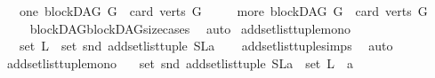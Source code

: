 \begin{isabellebody}
\ \ {\isacharbar}{\kern0pt}\ {\isacharparenleft}{\kern0pt}one{\isacharparenright}{\kern0pt}\ {\isachardoublequoteopen}blockDAG\ G\ {\isasymand}\ card\ {\isacharparenleft}{\kern0pt}verts\ G{\isacharparenright}{\kern0pt}\ {\isacharequal}{\kern0pt}\ {}{\isachardoublequoteclose}\isanewline
\ \ {\isacharbar}{\kern0pt}\ {\isacharparenleft}{\kern0pt}more{\isacharparenright}{\kern0pt}\ {\isachardoublequoteopen}blockDAG\ G\ {\isasymand}\ card\ {\isacharparenleft}{\kern0pt}verts\ G{\isacharparenright}{\kern0pt}\ {\isachargreater}{\kern0pt}\ {}{\isachardoublequoteclose}\isanewline
%
\isadelimproof
\ \ %
\endisadelimproof
%
\isatagproof
{}\isamarkupfalse%
\ \ blockDAG{\isachardot}{\kern0pt}blockDAG{\isacharunderscore}{\kern0pt}size{\isacharunderscore}{\kern0pt}cases\ \isamarkupfalse%
\ auto%
\endisatagproof
{\isafoldproof}%
%
\isadelimproof
%
\endisadelimproof
%
\isadelimdocument
%
\endisadelimdocument
%
\isatagdocument
%
\isamarkuptrue%
%
\endisatagdocument
{\isafolddocument}%
%
\isadelimdocument
%
\endisadelimdocument
{}\isamarkupfalse%
\ add{\isacharunderscore}{\kern0pt}set{\isacharunderscore}{\kern0pt}list{\isacharunderscore}{\kern0pt}tuple{\isacharunderscore}{\kern0pt}mono{\isacharcolon}{\kern0pt}\isanewline
\ \ \ {\isachardoublequoteopen}set\ L\ {\isasymsubseteq}\ set\ {\isacharparenleft}{\kern0pt}snd\ {\isacharparenleft}{\kern0pt}add{\isacharunderscore}{\kern0pt}set{\isacharunderscore}{\kern0pt}list{\isacharunderscore}{\kern0pt}tuple\ {\isacharparenleft}{\kern0pt}{\isacharparenleft}{\kern0pt}S{\isacharcomma}{\kern0pt}L{\isacharparenright}{\kern0pt}{\isacharcomma}{\kern0pt}a{\isacharparenright}{\kern0pt}{\isacharparenright}{\kern0pt}{\isacharparenright}{\kern0pt}{\isachardoublequoteclose}\isanewline
%
\isadelimproof
\ \ %
\endisadelimproof
%
\isatagproof
{}\isamarkupfalse%
\ add{\isacharunderscore}{\kern0pt}set{\isacharunderscore}{\kern0pt}list{\isacharunderscore}{\kern0pt}tuple{\isachardot}{\kern0pt}simps\ \isamarkupfalse%
\ auto%
\endisatagproof
{\isafoldproof}%
%
\isadelimproof
\isanewline
%
\endisadelimproof
\isanewline
{}\isamarkupfalse%
\ add{\isacharunderscore}{\kern0pt}set{\isacharunderscore}{\kern0pt}list{\isacharunderscore}{\kern0pt}tuple{\isacharunderscore}{\kern0pt}mono{}{\isacharcolon}{\kern0pt}\isanewline
\ \ \ {\isachardoublequoteopen}set\ {\isacharparenleft}{\kern0pt}snd\ {\isacharparenleft}{\kern0pt}add{\isacharunderscore}{\kern0pt}set{\isacharunderscore}{\kern0pt}list{\isacharunderscore}{\kern0pt}tuple\ {\isacharparenleft}{\kern0pt}{\isacharparenleft}{\kern0pt}S{\isacharcomma}{\kern0pt}L{\isacharparenright}{\kern0pt}{\isacharcomma}{\kern0pt}a{\isacharparenright}{\kern0pt}{\isacharparenright}{\kern0pt}{\isacharparenright}{\kern0pt}\ {\isasymsubseteq}\ set\ L\ {\isasymunion}\ {\isacharbraceleft}{\kern0pt}a{\isacharbraceright}{\kern0pt}\ {\isachardoublequoteclose}\isanewline

\end{isabellebody}
